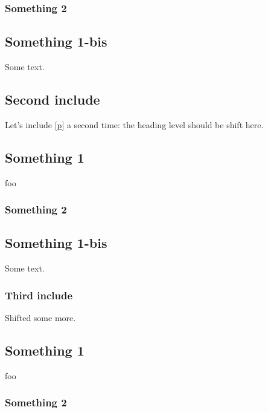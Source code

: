 \subsubsection{Something 2\label{something-2_2}}%
\subsection{Something 1-bis\label{something-1-bis_2}}%
Some text.

\subsection{Second include\label{second-include}}%
Let's include \hyperref[Include_sections-module-type-Something]{[p\pageref*{Include_sections-module-type-Something}]} a second time: the heading level should be shift here.

 \hyperref[Include_sections-module-type-Something]{}\subsection{Something 1\label{something-1_3}}%
foo

\subsubsection{Something 2\label{something-2_3}}%
\subsection{Something 1-bis\label{something-1-bis_3}}%
Some text.

\subsubsection{Third include\label{third-include}}%
Shifted some more.

 \hyperref[Include_sections-module-type-Something]{}\subsection{Something 1\label{something-1_4}}%
foo

\subsubsection{Something 2\label{something-2_4}}%

